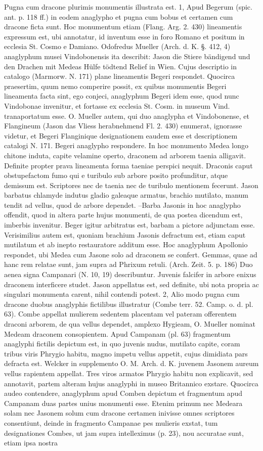 \documentclass[a4paper, 11pt, oneside, polutonikogreek, german]{article}
\begin{document}
Pugna cum dracone plurimis monumentis illustrata est. 1, Apud Begerum (spic. ant. p. 118 ff.) in eodem anaglypho et pugna cum bobus et certamen cum dracone ficta sunt. Hoc monumentum etiam (Flang. Arg. 2. 430) lineamentis expressum est, ubi annotatur, id inventum esse in foro Romano et positum in ecclesia St. Cosmo e Damiano. Odofredus Mueller (Arch. d. K. §. 412, 4) anaglyphum musei Vindobonensis ita describit: Jason die Stiere bändigend und den Drachen mit Medeas Hülfe tödtend Relief in Wien. Cujus descriptio in catalogo (Marmorw. N. 171) plane lineamentis Begeri respondet. Quocirca praesertim, quum nemo comperire possit, ex quibus monumentis Begeri lineamenta facta sint, ego conjeci, anaglyphum Begeri idem esse, quod nunc Vindobonae invenitur, et fortasse ex ecclesia St. Cosm. in museum Vind. tranaportatum esse. O. Mueller autem, qui duo anaglypha et Vindobonense, et Flangineum (Jason das Vliess herabnehmend Fl. 2. 430) enumerat, ignorasse videtur, et Begeri Flanginique designationem eaudem esse et descriptionem catalogi N. 171. Begeri anaglypho respondere. In hoc monumento Medea longo chitone induta, capite velamine operto, draconem ad arborem taenia alligavit. Definite propter prava lineamenta forma taeniae perspici nequit. Draconis caput obstupefactom fumo qui e turibulo sub arbore posito profunditur, atque demissum est. Scriptores nec de taenia nec de turibulo mentionem fecerunt. Jason barbatus chlamyde indutus gladio galeaque armatus, brachio mutilato, manum tendit ad vellus, quod de arbore dependet. --Barba Jasonis in hoc anaglypho offendit, quod in altera parte hujus monumenti, de qua postea dicendum est, imberbis invenitur. Beger igitur arbitratus est, barbam a pictore adjunctam esse. Verisimilius autem est, quoniam brachium Jasonis defractum est, etiam caput mutilatum et ab inepto restauratore additum esse. Hoc anaglyphum Apollonio respondet, ubi Medea cum Jasone solo ad draconem se confert. Gemmas, quae ad hanc rem relatae sunt, jam supra ad Phrixum retuli. (Arch. Zeit. 5. p. 186) Duo aenea signa Campanari (N. 10, 19) describuntur. Juvenis falcifer in arbore enixus draconem interficere studet. Jason appellatus est, sed definite, ubi nota propria ac singulari monumenta carent, nihil contendi potest. 2, Alio modo pugna cum dracone duobus anaglyphis fictilibus illustratur (Combe terr. 52. Camp. o. d. pl. 63). Combe appellat mulierem sedentem placentam vel pateram offerentem draconi arborem, de qua vellus dependet, amplexo Hygieam, O. Mueller nominat Medeam draconem consopientem. Apud Campanam (pl. 63) fragmentum anaglyphi fictilis depictum est, in quo juvenis nudus, mutilato capite, coram tribus viris Phrygio habitu, magno impetu vellus appetit, cujus dimidiata pars defracta est. Welcker in supplemento O. M. Arch. d. K. juvenem Jasonem aureum vellus rapientem appellat. Tres viros armatos Phrygio habitu non explicavit, sed annotavit, partem alteram hujus anaglyphi in museo Britannico exstare. Quocirca audeo contendere, anaglyphum apud Comben depictum et fragmentum apud Campanam duas partes unius monumenti esse. Etenim primum nec Medeara solam nec Jasonem solum cum dracone certamen inivisse omnes scriptores consentiunt, deinde in fragmento Campanae pes mulieris exstat, tum designationes Combes, ut jam supra intelleximus (p. 23), nou accuratae sunt, etiam ipsa nostra 
\end{document}
